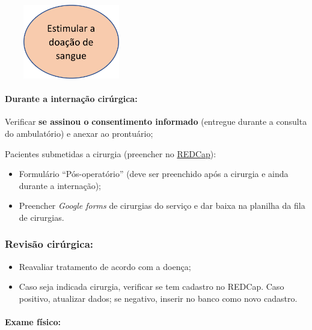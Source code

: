 \documentclass[
]{article}
\begin{document}
\includegraphics[width=2.30208in,height=1.28125in]{Imagem1.png}

\hypertarget{durante-a-internauxe7uxe3o-ciruxfargica}{%
\paragraph{\texorpdfstring{\textbf{Durante a internação
cirúrgica:}}{Durante a internação cirúrgica:}}\label{durante-a-internauxe7uxe3o-ciruxfargica}}

Verificar \textbf{se assinou o} \textbf{consentimento informado}
(entregue durante a consulta do ambulatório) e anexar ao prontuário;

Pacientes submetidas a cirurgia (preencher no
\href{www.redcap.lampada.uerj.br}{REDCap}):

\begin{itemize}
\item
  Formulário ``Pós-operatório'' (deve ser preenchido após a cirurgia e
  ainda durante a internação);
\item
  Preencher \emph{Google forms} de cirurgias do serviço e dar baixa na
  planilha da fila de cirurgias.
\end{itemize}

\hypertarget{revisuxe3o-ciruxfargica}{%
\subsubsection{\texorpdfstring{\textbf{Revisão
cirúrgica:}}{Revisão cirúrgica:}}\label{revisuxe3o-ciruxfargica}}

\begin{itemize}
\item
  Reavaliar tratamento de acordo com a doença;
\item
  Caso seja indicada cirurgia, verificar se tem cadastro no REDCap. Caso
  positivo, atualizar dados; se negativo, inserir no banco como novo
  cadastro.
\end{itemize}

\hypertarget{exame-fuxedsico}{%
\paragraph{Exame físico:}\label{exame-fuxedsico}}
\end{document}
